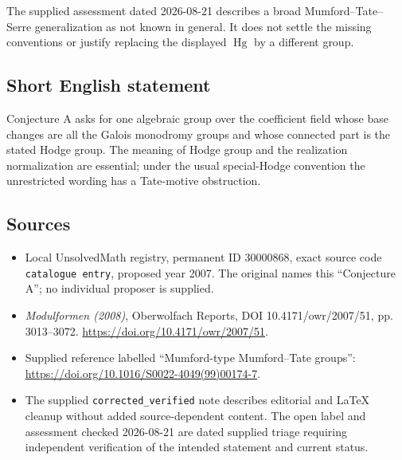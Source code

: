 \documentclass[11pt]{article}
\begin{document}
The supplied assessment dated 2026-08-21 describes a broad Mumford--Tate--Serre generalization as not known in general. It does not settle the missing conventions or justify replacing the displayed \(\operatorname{Hg}\) by a different group.
\subsection{Short English statement}
Conjecture A asks for one algebraic group over the coefficient field whose base changes are all the Galois monodromy groups and whose connected part is the stated Hodge group. The meaning of Hodge group and the realization normalization are essential; under the usual special-Hodge convention the unrestricted wording has a Tate-motive obstruction.
\subsection{Sources}
\begin{itemize}
\item Local UnsolvedMath registry, permanent ID \(30000868\), exact source code \texttt{catalogue entry}, proposed year 2007. The original names this ``Conjecture A''; no individual proposer is supplied.
\item \emph{Modulformen (2008)}, Oberwolfach Reports, DOI 10.4171/owr/2007/51, pp. 3013--3072. \url{https://doi.org/10.4171/owr/2007/51}.
\item Supplied reference labelled ``Mumford-type Mumford--Tate groups'': \url{https://doi.org/10.1016/S0022-4049(99)00174-7}.
\item The supplied \texttt{corrected\_verified} note describes editorial and LaTeX cleanup without added source-dependent content. The open label and assessment checked 2026-08-21 are dated supplied triage requiring independent verification of the intended statement and current status.
\end{itemize}
\end{document}

